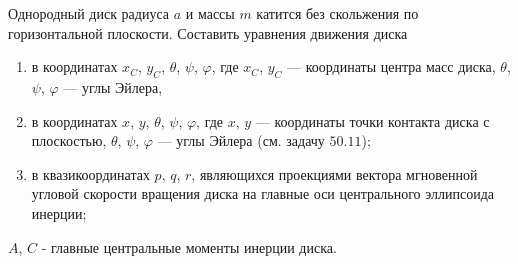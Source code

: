 Однородный диск радиуса $a$ и массы $m$ катится
без скольжения по горизонтальной плоскости.
Составить уравнения движения диска
\begin{enumerate}
\item в координатах $x_C$, $y_C$, $\theta$, $\psi$, $\varphi$,
где $x_C$, $y_C$ --- координаты центра масс диска,
$\theta$, $\psi$, $\varphi$ --- углы Эйлера,
\item в координатах $x$, $y$, $\theta$, $\psi$, $\varphi$, где $x$, $y$ ---
координаты точки контакта диска с плоскостью,
$\theta$, $\psi$, $\varphi$ --- углы Эйлера (см. задачу $50.11$);
\item в квазикоординатах $p$, $q$, $r$, являющихся проекциями вектора
мгновенной угловой скорости вращения диска на главные оси центрального
эллипсоида инерции;
\end{enumerate}
$A$, $C$ - главные центральные моменты инерции диска.
